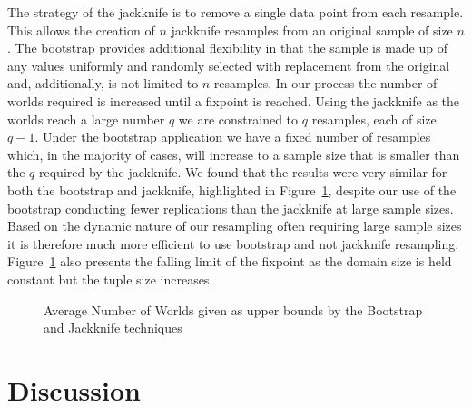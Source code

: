 The strategy of the jackknife is to remove a single data point from each
resample. This allows the creation of $n$ jackknife resamples from an
original sample of size $n$.  The bootstrap provides additional flexibility
in that the sample is made up of any values uniformly and randomly selected
with replacement from the original and, additionally, is not limited to
$n$ resamples.  In our process the number of worlds required is increased
until a fixpoint is reached. Using the jackknife as the worlds reach a
large number $q$ we are constrained to $q$ resamples, each of size $q-1$.
Under the bootstrap application we have a fixed number of resamples which,
in the majority of cases,
will increase to a sample size that is smaller than the $q$ required by the 
jackknife. We found
that the results were very similar for both the bootstrap and jackknife, 
highlighted in Figure~\ref{graph:bj1}, 
despite our use of the bootstrap conducting fewer replications than the
jackknife at large sample sizes. Based on the dynamic nature of our
resampling often requiring large sample sizes it is therefore much
more efficient to use bootstrap and not jackknife resampling. 
Figure~\ref{graph:bj1} also presents
the falling limit of the fixpoint as the domain size is held constant but
the tuple size increases. 
\begin{figure}
\centerline{}
\caption{\label{graph:bj1}\scriptsize{ Average Number of Worlds given as 
upper bounds by the Bootstrap and Jackknife techniques}}
\end{figure}



\section{Discussion}\label{sec:cp_disc}


